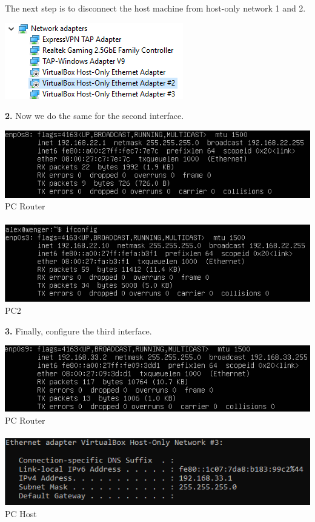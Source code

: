 \documentclass[12pt]{extarticle}
\begin{document}
The next step is to disconnect the host machine from host-only network 1 and 2.\\
\begin{center}
\includegraphics[scale=0.8]{resources/1-0-0.png}\\
\end{center}

\textbf{2.} Now we do the same for the second interface.
\begin{center}
\includegraphics[scale=0.8]{resources/1-2-1.png}\\
PC Router\\~\\
\includegraphics[scale=0.8]{resources/1-2-2.png}\\
PC2
\end{center}

\textbf{3.} Finally, configure the third interface.
\begin{center}
\includegraphics[scale=0.8]{resources/1-3-1.png}\\
PC Router\\~\\
\includegraphics[scale=0.8]{resources/1-3-2.png}\\
PC Host
\end{center}
\end{document}
